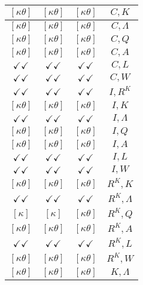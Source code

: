 \documentclass[a4paper,10pt]{article}
\begin{document}
\begin{longtable}{|c|c|c|c|}
\hline
$[\kappa \theta ]$ & $[\kappa \theta ]$ & $[\kappa \theta ]$ & ${C},{K}$ \\
\hline
$[\kappa \theta ]$ & $[\kappa \theta ]$ & $[\kappa \theta ]$ & ${C},{\Lambda}$ \\
\hline
$[\kappa \theta ]$ & $[\kappa \theta ]$ & $[\kappa \theta ]$ & ${C},{Q}$ \\
\hline
$[\kappa \theta ]$ & $[\kappa \theta ]$ & $[\kappa \theta ]$ & ${C},{A}$ \\
\hline
$\checkmark\checkmark$ & $\checkmark\checkmark$ & $\checkmark\checkmark$ & ${C},{L}$ \\
\hline
$\checkmark\checkmark$ & $\checkmark\checkmark$ & $\checkmark\checkmark$ & ${C},{W}$ \\
\hline
$\checkmark\checkmark$ & $\checkmark\checkmark$ & $\checkmark\checkmark$ & ${I},{R^{K}}$ \\
\hline
$[\kappa \theta ]$ & $[\kappa \theta ]$ & $[\kappa \theta ]$ & ${I},{K}$ \\
\hline
$\checkmark\checkmark$ & $\checkmark\checkmark$ & $\checkmark\checkmark$ & ${I},{\Lambda}$ \\
\hline
$[\kappa \theta ]$ & $[\kappa \theta ]$ & $[\kappa \theta ]$ & ${I},{Q}$ \\
\hline
$[\kappa \theta ]$ & $[\kappa \theta ]$ & $[\kappa \theta ]$ & ${I},{A}$ \\
\hline
$\checkmark\checkmark$ & $\checkmark\checkmark$ & $\checkmark\checkmark$ & ${I},{L}$ \\
\hline
$\checkmark\checkmark$ & $\checkmark\checkmark$ & $\checkmark\checkmark$ & ${I},{W}$ \\
\hline
$[\kappa \theta ]$ & $[\kappa \theta ]$ & $[\kappa \theta ]$ & ${R^{K}},{K}$ \\
\hline
$\checkmark\checkmark$ & $\checkmark\checkmark$ & $\checkmark\checkmark$ & ${R^{K}},{\Lambda}$ \\
\hline
$[\kappa ]$ & $[\kappa ]$ & $[\kappa \theta ]$ & ${R^{K}},{Q}$ \\
\hline
$[\kappa \theta ]$ & $[\kappa \theta ]$ & $[\kappa \theta ]$ & ${R^{K}},{A}$ \\
\hline
$\checkmark\checkmark$ & $\checkmark\checkmark$ & $\checkmark\checkmark$ & ${R^{K}},{L}$ \\
\hline
$[\kappa \theta ]$ & $[\kappa \theta ]$ & $[\kappa \theta ]$ & ${R^{K}},{W}$ \\
\hline
$[\kappa \theta ]$ & $[\kappa \theta ]$ & $[\kappa \theta ]$ & ${K},{\Lambda}$ \\
\hline

\end{longtable}
\end{document}
